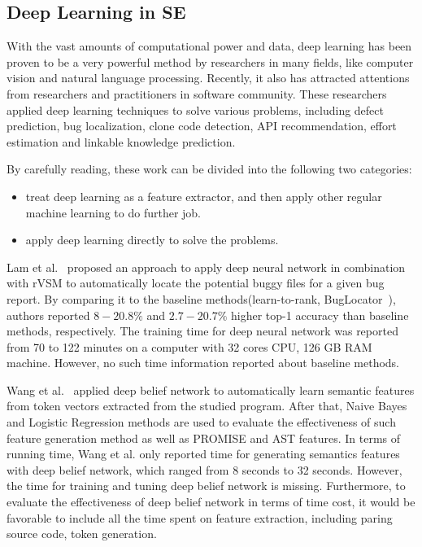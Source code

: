 \documentclass[sigconf,review, anonymous]{acmart}
\theoremstyle{break}
\begin{document}
\subsection{Deep Learning in SE}
With the vast amounts of computational power and data, 
deep learning has been proven to be a very powerful method 
by researchers in many fields\cite{lecun2015deep}, like computer vision and natural language processing\cite{krizhevsky2012imagenet,mikolov2013distributed,sutskever2014sequence}. 
Recently, it also has attracted  attentions from researchers and practitioners in software
 community\cite{wang2016automatically, gu2016deep, xu2016predicting,white2016deep,white2015toward,lam2015combining,choetkiertikul2016deep}.
 These researchers applied  deep learning techniques to solve various problems,
 including defect prediction, bug localization, clone code detection, API recommendation, 
 effort estimation and linkable knowledge prediction.
 
By carefully reading, these work can be divided into the following two categories:
 
\begin{itemize}
\item treat deep learning as a feature extractor, and then apply other regular machine learning to do further job.
\item apply deep learning directly to solve the problems.
\end{itemize}

Lam et al.~\cite{lam2015combining}  proposed an approach to apply deep neural network
 in combination with rVSM to automatically locate the potential buggy files for a given
 bug report. By comparing it to the baseline methods(learn-to-rank\cite{ye2014learning}, 
 BugLocator~\cite{zhou2012should}), authors reported $8-20.8\%$  and $2.7-20.7\%$ 
 higher top-1 accuracy than baseline methods, respectively. The training time for deep neural
 network was reported from 70 to 122 minutes on a computer with 32 cores CPU,
 126 GB RAM machine. However,
 no such time information reported about baseline methods.
 
 Wang et al.~\cite{wang2016automatically} applied deep belief network to automatically
 learn semantic features from token vectors extracted from the studied program. After
 that, Naive Bayes and Logistic Regression methods are used to evaluate the effectiveness
 of such feature generation method as well as PROMISE and AST features. In terms of
 running time, Wang et al. only reported time for generating semantics features with deep belief network, which
 ranged from 8 seconds to 32 seconds. However, the time for training and tuning deep belief network is
 missing. Furthermore, to evaluate the effectiveness of deep belief network in terms of time cost, 
 it would be favorable to include all the time spent on feature extraction, including
 paring source code, token generation.
 
\end{document}
